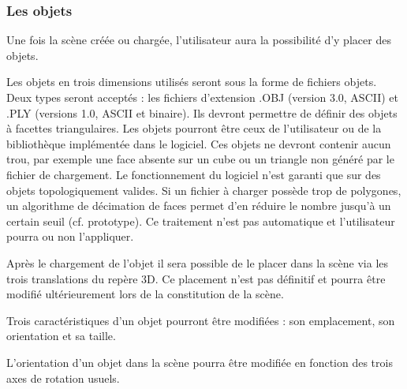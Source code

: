 \subsubsection{Les objets}
Une fois la scène créée ou chargée, l’utilisateur aura la possibilité d’y placer des objets.

\begin{description}[style=nextline]
	\item[Chargement des fichiers objets]
	\mbox{\hspace{1cm}} Les objets en trois dimensions utilisés seront sous la forme de fichiers objets. Deux types seront acceptés : les fichiers d’extension .OBJ (version 3.0, ASCII) et .PLY (versions 1.0, ASCII et binaire). Ils devront permettre de définir des objets à facettes triangulaires. Les objets pourront être ceux de l’utilisateur ou de la bibliothèque implémentée dans le logiciel. \newline
	\mbox{\hspace{1cm}}Ces objets ne devront contenir aucun trou, par exemple une face absente sur un cube ou un triangle non généré par le fichier de chargement. Le fonctionnement du logiciel n’est garanti que sur des objets topologiquement valides. \newline
	\mbox{\hspace{1cm}}Si un fichier à charger possède trop de polygones, un algorithme de décimation de faces permet d’en réduire le nombre jusqu’à un certain seuil (cf. prototype). Ce traitement n’est pas automatique et l’utilisateur pourra ou non l’appliquer.
	
	\item[Placement d'un objet]
	\mbox{\hspace{1cm}} Après le chargement de l’objet il sera possible de le placer dans la scène via les trois translations du repère 3D. Ce placement n’est pas définitif et pourra être modifié ultérieurement lors de la constitution de la scène.
	
	\item[Modification d'un objet]
	\mbox{\hspace{1cm}}Trois caractéristiques d’un objet pourront être modifiées : son emplacement, son orientation et sa taille.
	
	\item[Modification de l'orientation d'un objet]
		\mbox{\hspace{1cm}}	L’orientation d’un objet dans la scène pourra être modifiée en fonction des trois axes de rotation usuels.
	

\end{description}
